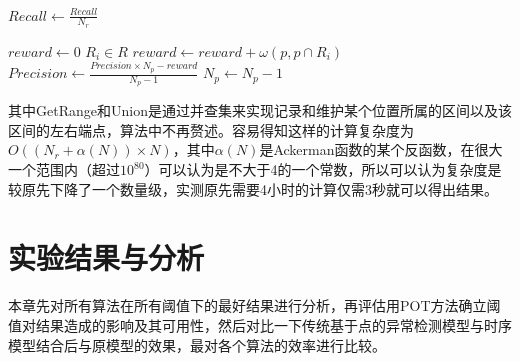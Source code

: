 \begin{breakablealgorithm}
\begin{algorithmic}[1]
      \State

      \State $Recall \gets \frac{Recall}{N_r}$

      \State $reward \gets 0$
      \ForAll $R_i \in R$
            \State $reward \gets reward + \omega(p, p \cap R_i)$
      \EndFor
      \State $Precision \gets \frac{Precision \times N_p - reward}{N_p - 1}$
      \State $N_p \gets N_p - 1$
      \EndFunction
    \end{algorithmic}
  \end{breakablealgorithm}

  其中GetRange和Union是通过并查集来实现记录和维护某个位置所属的区间以及该区间的左右端点，算法中不再赘述。容易得知这样的计算复杂度为$O((N_r + \alpha(N))\times N)$，其中$\alpha(N)$是Ackerman函数的某个反函数，在很大一个范围内（超过$10^{80}$）可以认为是不大于4的一个常数，所以可以认为复杂度是较原先下降了一个数量级，实测原先需要4小时的计算仅需3秒就可以得出结果。
\section{实验结果与分析}
本章先对所有算法在所有阈值下的最好结果进行分析，再评估用POT方法确立阈值对结果造成的影响及其可用性，然后对比一下传统基于点的异常检测模型与时序模型结合后与原模型的效果，最对各个算法的效率进行比较。
